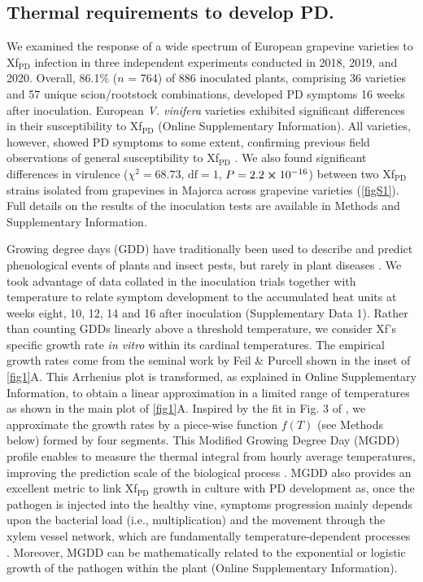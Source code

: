 \subsection{Thermal requirements to develop PD.}
We examined the response
of a wide spectrum of European grapevine varieties to Xf$_{\textrm{PD}}$
infection in three independent experiments conducted in 2018, 2019, and 2020.
Overall, 86.1\% ($n$ = 764) of 886 inoculated plants, comprising 36 varieties
and 57 unique scion/rootstock combinations, developed PD symptoms 16 weeks
after inoculation. European \textit{V. vinifera} varieties exhibited
significant differences in their susceptibility to Xf$_{\textrm{PD}}$
(Online Supplementary Information). All varieties, however, showed PD symptoms
to some
extent,
confirming previous field observations of general susceptibility to
Xf$_{\textrm{PD}}$ \cite{Hopkins2002, Moralejo2019, Purcell2013}.  We also
found significant differences in virulence ($\chi^2=68.73$, $\textrm{df}=1$,
$P=2.2 \cross 10^{-16}$) between two Xf$_{\textrm{PD}}$ strains isolated from
grapevines in Majorca across grapevine varieties (\cref{figS1}). Full details
on the results of the inoculation tests are available in Methods and
Supplementary
Information.

Growing degree days (GDD) have traditionally been used to describe and predict
phenological events of plants and insect pests, but rarely in plant diseases
\cite{McMaster1997}. We took advantage of data collated in the inoculation
trials together with temperature to relate symptom development to the
accumulated heat units at weeks eight, 10, 12, 14 and 16 after inoculation
(Supplementary Data 1).  Rather than counting GDDs linearly above a threshold
temperature, we consider Xf's specific growth rate \textit{in vitro} within its
cardinal temperatures. The empirical growth rates come from the seminal work by
Feil \& Purcell \cite{Feil2001} shown in the inset of \cref{fig1}A. This
Arrhenius plot is transformed, as explained in Online Supplementary
Information, to obtain a
linear approximation in a limited range of temperatures as shown in the main
plot of \cref{fig1}A. Inspired by the fit in Fig. 3 of \cite{Feil2001}, we
approximate the growth rates by a piece-wise function $f(T )$ (see Methods
below) formed by four segments. This Modified Growing Degree Day (MGDD) profile
\label{eq:MGDD_def} enables to measure the thermal integral from hourly average
temperatures, improving the prediction scale of the biological process
\cite{butikofer2020problem}. MGDD also provides an excellent metric to link
Xf$_{\textrm{PD}}$ growth in culture with PD development as, once the pathogen
is injected into the healthy vine, symptoms progression mainly depends upon the
bacterial load (i.e., multiplication) and the movement through the xylem vessel
network, which are fundamentally temperature-dependent processes
\cite{fry1990multiplication,Feil2001}. Moreover, MGDD can be mathematically
related to the exponential or logistic growth of the pathogen within the plant
(Online Supplementary Information).

